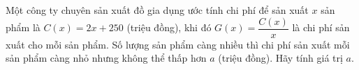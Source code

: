 \begin{ex}%
	Một công ty chuyên sản xuất đồ gia dụng ước tính chi phí để sản xuất $x$   sản phẩm là $C(x)=2x+250$ (triệu đồng), khi đó $G(x)=\dfrac{C(x)}{x}$  là chi phí sản xuất cho mỗi sản phẩm. Số lượng sản phẩm càng nhiều thì chi phí sản xuất mỗi sản phẩm càng nhỏ nhưng không thể thấp hơn $a$ (triệu đồng). Hãy tính giá trị $a$.
	
\end{ex}

